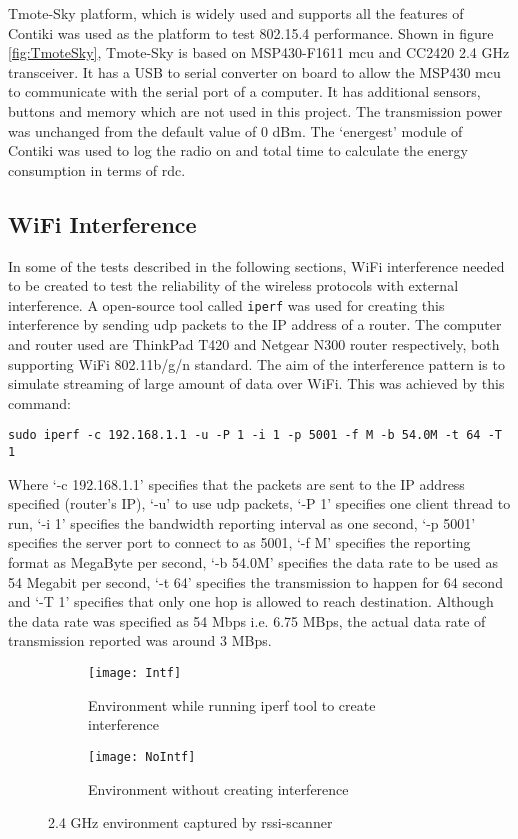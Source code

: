 Tmote-Sky platform, which is widely used and supports all the features of Contiki was used as the platform to test 802.15.4 performance. Shown in figure \ref{fig:TmoteSky}, Tmote-Sky is based on MSP430-F1611 \gls{mcu} and  CC2420 2.4 GHz transceiver. It has a USB to serial converter on board to allow the MSP430 \gls{mcu} to communicate with the serial port of a computer. It has additional sensors, buttons and memory which are not used in this project. The transmission power was unchanged from the default value of 0 dBm. The `energest' module of Contiki was used to log the radio on and total time to calculate the energy consumption in terms of \gls{rdc}. 



\subsection{WiFi Interference}
In some of the tests described in the following sections, WiFi interference needed to be created to test the reliability of the wireless protocols with external interference. A open-source tool called \texttt{iperf} was used for creating this interference by sending \gls{udp} packets to the IP address of a router. The computer and router used are ThinkPad T420 and Netgear N300 router respectively, both supporting WiFi 802.11b/g/n standard. The aim of the interference pattern is to simulate streaming of large amount of data over WiFi. This was achieved by this command:

\texttt{sudo iperf -c 192.168.1.1 -u -P 1 -i 1 -p 5001 -f M -b 54.0M -t 64 -T 1}

Where `-c 192.168.1.1' specifies that the packets are sent to the IP address specified (router's IP), `-u' to use \gls{udp} packets, `-P 1' specifies one client thread to run, `-i 1' specifies the bandwidth reporting interval as one second, `-p 5001' specifies the server port to connect to as 5001, `-f M' specifies the reporting format as MegaByte per second, `-b 54.0M' specifies the data rate to be used as 54 Megabit per second, `-t 64' specifies the transmission to happen for 64 second and `-T 1' specifies that only one hop is allowed to reach destination. Although the data rate was specified as 54 Mbps i.e. 6.75 MBps, the actual data rate of transmission reported was around 3 MBps. 

\begin{figure}[h]
	\begin{subfigure}[b]{1\textwidth}
		\texttt{[image: Intf]}
		\caption{Environment while running iperf tool to create interference}
		\vspace{10pt}
		\label{fig:Intf}
	\end{subfigure}

	\begin{subfigure}[b]{1\textwidth}
		\texttt{[image: NoIntf]}
		\caption{Environment without creating interference}
		\label{fig:NoIntf}
	\end{subfigure}
	\caption{2.4 GHz environment captured by rssi-scanner}
	\vspace{-10pt}
\end{figure}


